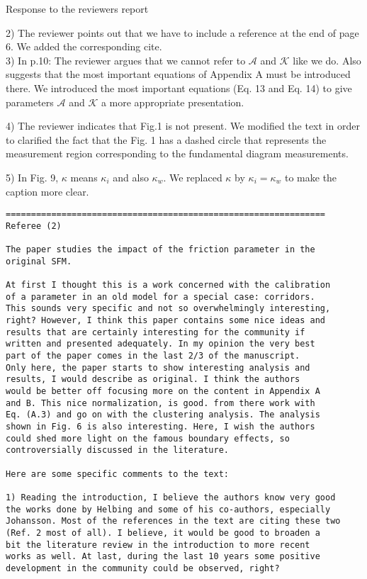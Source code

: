 \documentclass[a4paper,12pt]{letter}
\begin{document}
\begin{letter}{Response to the reviewers report}
{2) The reviewer points out that we have to include a reference at the end of 
page 6. We added the corresponding cite. \\

3) In p.10: The reviewer argues that we cannot refer to $\mathcal{A}$ and $\mathcal{K}$ like we do. Also suggests that the most important equations of Appendix A must be introduced there. We introduced the most important equations (Eq. 13 and Eq. 14) to give parameters $\mathcal{A}$ and $\mathcal{K}$ a more appropriate presentation. 

4) The reviewer indicates that Fig.1 is not present. We modified the text in order to clarified the fact that the Fig. 1 has a 
dashed circle that represents the measurement region corresponding to the fundamental diagram measurements. 

5) In Fig. 9, $\kappa$ means $\kappa_i$ and also $\kappa_w$. We replaced $\kappa$ by $\kappa_i = \kappa_w$ to make the caption more clear.   


}

\newpage

\begin{verbatim}
===============================================================
Referee (2)

The paper studies the impact of the friction parameter in the 
original SFM.

At first I thought this is a work concerned with the calibration 
of a parameter in an old model for a special case: corridors. 
This sounds very specific and not so overwhelmingly interesting,
right? However, I think this paper contains some nice ideas and 
results that are certainly interesting for the community if 
written and presented adequately. In my opinion the very best 
part of the paper comes in the last 2/3 of the manuscript.
Only here, the paper starts to show interesting analysis and 
results, I would describe as original. I think the authors 
would be better off focusing more on the content in Appendix A
and B. This nice normalization, is good. from there work with 
Eq. (A.3) and go on with the clustering analysis. The analysis 
shown in Fig. 6 is also interesting. Here, I wish the authors 
could shed more light on the famous boundary effects, so
controversially discussed in the literature.

Here are some specific comments to the text:

1) Reading the introduction, I believe the authors know very good 
the works done by Helbing and some of his co-authors, especially 
Johansson. Most of the references in the text are citing these two 
(Ref. 2 most of all). I believe, it would be good to broaden a 
bit the literature review in the introduction to more recent 
works as well. At last, during the last 10 years some positive 
development in the community could be observed, right?


\end{verbatim}
\end{letter}
\end{document}
